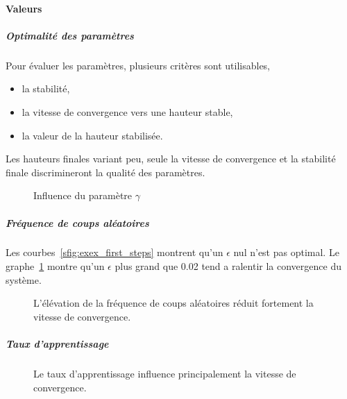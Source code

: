 \documentclass{report}
\begin{document}
\paragraph{Valeurs}
\subparagraph{Optimalité des paramètres}
Pour évaluer les paramètres, plusieurs critères sont utilisables,
\begin{itemize}
  \item la stabilité,
  \item la vitesse de convergence vers une hauteur stable,
  \item la valeur de la hauteur stabilisée.
\end{itemize}
Les hauteurs finales variant peu, seule la vitesse de convergence et la
stabilité finale discrimineront la qualité des paramètres.


\begin{figure}
  \centering
  \caption{Influence du paramètre \(\gamma\)}
\end{figure}

\subparagraph{Fréquence de coups aléatoires} Les
courbes~\ref{sfig:exex_first_steps} montrent qu'un \(\epsilon\) nul n'est pas
optimal. Le graphe~\ref{fig:eps_high} montre qu'un \(\epsilon\) plus grand
que 0.02 tend a ralentir la convergence du système.
\begin{figure}
  \centering
  \caption{L'élévation de la fréquence de coups aléatoires réduit fortement la
  vitesse de convergence.}\label{fig:eps_high}
\end{figure}


\subparagraph{Taux d'apprentissage}
\begin{figure}
  \centering
  \caption{Le taux d'apprentissage influence principalement la vitesse de
  convergence.}\label{fig:alphap}
\end{figure}
\end{document}
